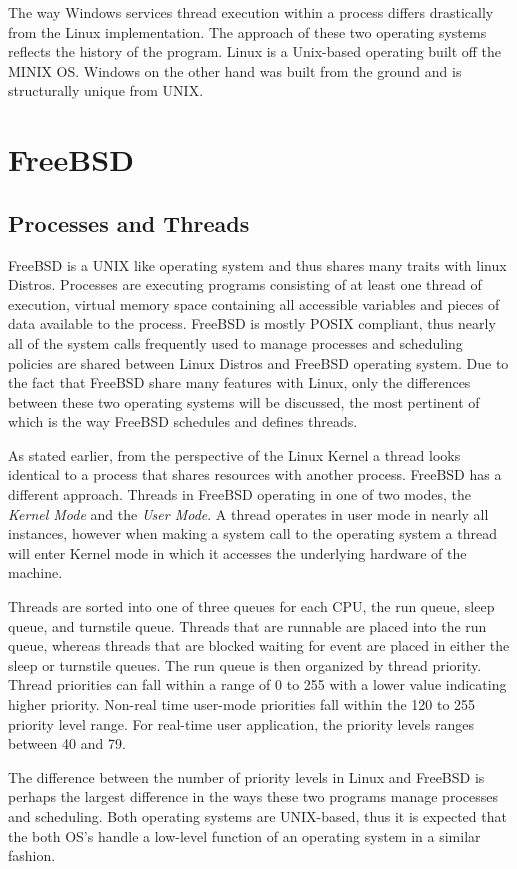 	\normalfont \indent The way Windows services thread execution within a process differs drastically from the Linux implementation. The approach of these two operating systems reflects the history of the program. Linux is a Unix-based operating built off the MINIX OS. Windows on the other hand was built from the ground and is structurally unique from UNIX.

\section{\bf FreeBSD}
\normalfont \indent
  \subsection{\bf Processes and Threads}
    \normalfont \indent FreeBSD is a UNIX like operating system and thus shares many traits with linux Distros. Processes are executing programs consisting of at least one thread of execution, virtual memory space containing all accessible variables and pieces of data available to the process. FreeBSD is mostly POSIX compliant, thus nearly all of the system calls frequently used to manage processes and scheduling policies are shared between Linux Distros and FreeBSD operating system. Due to the fact that FreeBSD share many features with Linux, only the differences between these two operating systems will be discussed, the most pertinent of which is the way FreeBSD schedules and defines threads.

    \normalfont \indent As stated earlier, from the perspective of the Linux Kernel a thread looks identical to a process that shares resources with another process. FreeBSD has a different approach. Threads in FreeBSD operating in one of two modes, the \cite{FreeBSD}\textit{Kernel Mode} and the \textit{User Mode}. A thread operates in user mode in nearly all instances, however when making a system call to the operating system a thread will enter Kernel mode in which it accesses the underlying hardware of the machine.

    \normalfont \indent Threads are sorted into one of three queues for each CPU,  \cite{FreeBSDDesign} the run queue, sleep queue, and turnstile queue. Threads that are runnable are placed into the run queue, whereas threads that are blocked waiting for event are placed in either the sleep or turnstile queues. The run queue is then organized by thread priority. Thread priorities can fall within a range of 0 to 255 with a lower value indicating higher priority. Non-real time user-mode priorities fall within the 120 to 255 priority level range. For real-time user application, the priority levels ranges between 40 and 79\cite{FreeBSDDesign}.

    \normalfont \indent The difference between the number of  priority levels in Linux and FreeBSD is perhaps the largest difference in the ways these two programs manage processes and scheduling. Both operating systems are UNIX-based, thus it is expected that the both OS’s handle a low-level function of an operating system in a similar fashion.



